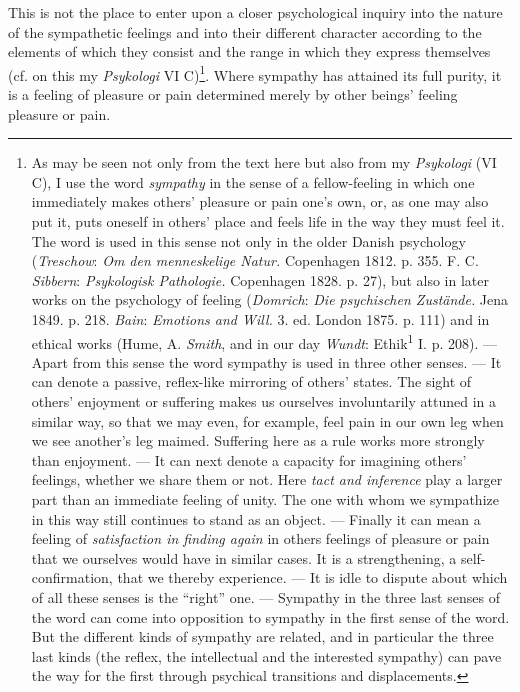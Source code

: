 \documentclass[12pt,a4paper,openany]{book}
\newcommand{\opage}[1]{\marginnote{\footnotesize\textit{[#1]}}}
\begin{document}
This is not the place to enter upon a closer psychological inquiry into the nature of the sympathetic
feelings and into their different character according to the elements of which they consist and the
range in which they express themselves (cf. on this my \textit{Psykologi} VI C)\footnote[1]{As may be
seen not only from the text here but also from my \textit{Psykologi} (VI C), I use the word
\textit{sympathy} in the sense of a fellow-feeling in which one immediately makes others' pleasure or
pain one's own, or, as one may also put it, puts oneself in others' place and feels life in the way
they must feel it. The word is used in this sense not only in the older Danish psychology
(\emph{Treschow}: \textit{Om den menneskelige Natur.} Copenhagen 1812. p. 355. F. C. \emph{Sibbern}:
\textit{Psykologisk Pathologie.} Copenhagen 1828. p. 27), but also in later works on the psychology of
feeling (\emph{Domrich}: \textit{Die psychischen Zustände.} Jena 1849. p. 218. \emph{Bain}: \textit{Emotions
and Will.} 3. ed. London 1875. p. 111) and in ethical works (Hume, A. \emph{Smith}, and in our day
\emph{Wundt}: Ethik\textsuperscript{1} I. p. 208). --- Apart from this sense the word sympathy is used
in three other senses. --- It can denote a passive, reflex-like mirroring of others' states. The sight
of others' enjoyment or suffering makes us ourselves involuntarily attuned in a similar way, so that
we may even, for example, feel pain in our own leg when we see another's leg maimed. Suffering here
as a rule works more strongly than enjoyment. --- It can next denote a capacity for imagining others'
feelings, whether we share them or not. Here \textit{tact and inference} play a larger part than an
immediate feeling of unity. The one with whom we sympathize in this way still continues to stand as
an object. --- Finally it can mean a feeling of \textit{satisfaction in finding again} in others
feelings of pleasure or pain that we ourselves would have in similar cases. It is a strengthening, a
self-confirmation, that we thereby experience. --- It is idle to dispute about which of all these
senses is the ``right'' one. --- Sympathy in the three last senses of the word can come into
opposition to sympathy in the first sense of the word. But the different kinds of sympathy are
related, and in particular the three last kinds (the reflex, the intellectual and the interested
sympathy) can pave the way for the first through psychical transitions and displacements.}. Where
sympathy has attained its full purity,
\opage{38}it is a feeling of pleasure or pain determined merely by other beings' feeling pleasure or pain.
\end{document}
